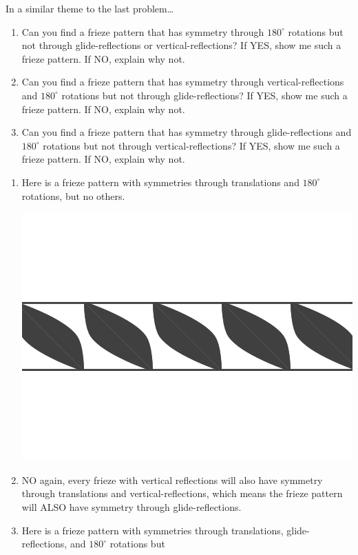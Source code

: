 \documentclass[noauthor,nooutcomes,12pt,hints,handout]{ximera}
\begin{document}
\begin{question}
  In a similar theme to the last problem\dots 
  \begin{enumerate}
    \item Can you find a frieze pattern that has symmetry through
      $180^\circ$ rotations but not through glide-reflections or
      vertical-reflections? If YES, show me such a frieze pattern. If
      NO, explain why not.
      
    \item Can you find a frieze pattern that has symmetry through
      vertical-reflections and $180^\circ$ rotations but not through
      glide-reflections? If YES, show me such a frieze pattern. If NO,
      explain why not.

    \item Can you find a frieze pattern that has symmetry through
      glide-reflections and $180^\circ$ rotations but not through
      vertical-reflections? If YES, show me such a frieze pattern. If
      NO, explain why not.
  \end{enumerate}
  \begin{freeResponse}
    \begin{enumerate}
    \item Here is a frieze pattern with symmetries through
      translations and $180^\circ$ rotations, but no others.
      \begin{center}
        \includegraphics[width=.6\textwidth]{ansR.png}
      \end{center}
    \item NO again, every frieze with vertical reflections will also
      have symmetry through translations and vertical-reflections,
      which means the frieze pattern will ALSO have symmetry through
      glide-reflections.
    \item Here is a frieze pattern with symmetries through
      translations, glide-reflections, and $180^\circ$ rotations but

\end{enumerate}
\end{freeResponse}
\end{question}
\end{document}
